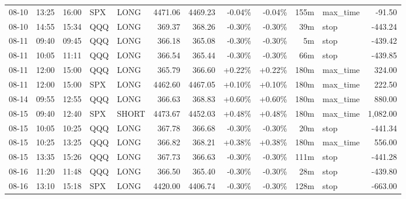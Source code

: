 \documentclass[11pt,a4paper,twoside]{article}
\begin{document}
\begin{center}
\begin{longtable}{>{\color{txtmain}}l l l l l r r r r r >{\color{txtmain}}l r}
08-10 & 13:25 & 16:00 & SPX & LONG & 4471.06 & 4469.23 & \textcolor{lossred}{-0.04\%} & \textcolor{lossred}{-0.04\%} & 155m & max\_time & \textcolor{lossred}{-91.50} \\
08-10 & 14:55 & 15:34 & QQQ & LONG & 369.37 & 368.26 & \textcolor{lossred}{-0.30\%} & \textcolor{lossred}{-0.30\%} & 39m & stop & \textcolor{lossred}{-443.24} \\
08-11 & 09:40 & 09:45 & QQQ & LONG & 366.18 & 365.08 & \textcolor{lossred}{-0.30\%} & \textcolor{lossred}{-0.30\%} & 5m & stop & \textcolor{lossred}{-439.42} \\
08-11 & 10:05 & 11:11 & QQQ & LONG & 366.54 & 365.44 & \textcolor{lossred}{-0.30\%} & \textcolor{lossred}{-0.30\%} & 66m & stop & \textcolor{lossred}{-439.85} \\
08-11 & 12:00 & 15:00 & QQQ & LONG & 365.79 & 366.60 & \textcolor{wingreen}{+0.22\%} & \textcolor{wingreen}{+0.22\%} & 180m & max\_time & \textcolor{wingreen}{324.00} \\
08-11 & 12:00 & 15:00 & SPX & LONG & 4462.60 & 4467.05 & \textcolor{wingreen}{+0.10\%} & \textcolor{wingreen}{+0.10\%} & 180m & max\_time & \textcolor{wingreen}{222.50} \\
08-14 & 09:55 & 12:55 & QQQ & LONG & 366.63 & 368.83 & \textcolor{wingreen}{+0.60\%} & \textcolor{wingreen}{+0.60\%} & 180m & max\_time & \textcolor{wingreen}{880.00} \\
08-15 & 09:40 & 12:40 & SPX & SHORT & 4473.67 & 4452.03 & \textcolor{wingreen}{+0.48\%} & \textcolor{wingreen}{+0.48\%} & 180m & max\_time & \textcolor{wingreen}{1,082.00} \\
08-15 & 10:05 & 10:25 & QQQ & LONG & 367.78 & 366.68 & \textcolor{lossred}{-0.30\%} & \textcolor{lossred}{-0.30\%} & 20m & stop & \textcolor{lossred}{-441.34} \\
08-15 & 10:25 & 13:25 & QQQ & LONG & 366.82 & 368.21 & \textcolor{wingreen}{+0.38\%} & \textcolor{wingreen}{+0.38\%} & 180m & max\_time & \textcolor{wingreen}{556.00} \\
08-15 & 13:35 & 15:26 & QQQ & LONG & 367.73 & 366.63 & \textcolor{lossred}{-0.30\%} & \textcolor{lossred}{-0.30\%} & 111m & stop & \textcolor{lossred}{-441.28} \\
08-16 & 11:20 & 11:48 & QQQ & LONG & 366.50 & 365.40 & \textcolor{lossred}{-0.30\%} & \textcolor{lossred}{-0.30\%} & 28m & stop & \textcolor{lossred}{-439.80} \\
08-16 & 13:10 & 15:18 & SPX & LONG & 4420.00 & 4406.74 & \textcolor{lossred}{-0.30\%} & \textcolor{lossred}{-0.30\%} & 128m & stop & \textcolor{lossred}{-663.00} \\

\end{longtable}
\end{center}
\end{document}
